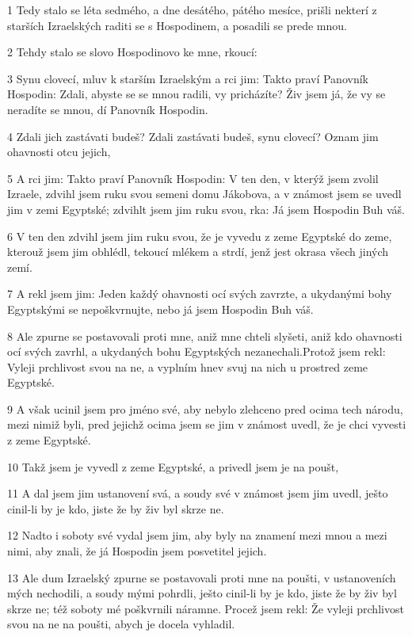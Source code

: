 \par 1 Tedy stalo se léta sedmého, a dne desátého, pátého mesíce, prišli nekterí z starších Izraelských raditi se s Hospodinem, a posadili se prede mnou.
\par 2 Tehdy stalo se slovo Hospodinovo ke mne, rkoucí:
\par 3 Synu clovecí, mluv k starším Izraelským a rci jim: Takto praví Panovník Hospodin: Zdali, abyste se se mnou radili, vy pricházíte? Živ jsem já, že vy se neradíte se mnou, dí Panovník Hospodin.
\par 4 Zdali jich zastávati budeš? Zdali zastávati budeš, synu clovecí? Oznam jim ohavnosti otcu jejich,
\par 5 A rci jim: Takto praví Panovník Hospodin: V ten den, v kterýž jsem zvolil Izraele, zdvihl jsem ruku svou semeni domu Jákobova, a v známost jsem se uvedl jim v zemi Egyptské; zdvihlt jsem jim ruku svou, rka: Já jsem Hospodin Buh váš.
\par 6 V ten den zdvihl jsem jim ruku svou, že je vyvedu z zeme Egyptské do zeme, kterouž jsem jim obhlédl, tekoucí mlékem a strdí, jenž jest okrasa všech jiných zemí.
\par 7 A rekl jsem jim: Jeden každý ohavnosti ocí svých zavrzte, a ukydanými bohy Egyptskými se nepoškvrnujte, nebo já jsem Hospodin Buh váš.
\par 8 Ale zpurne se postavovali proti mne, aniž mne chteli slyšeti, aniž kdo ohavnosti ocí svých zavrhl, a ukydaných bohu Egyptských nezanechali.Protož jsem rekl: Vyleji prchlivost svou na ne, a vyplním hnev svuj na nich u prostred zeme Egyptské.
\par 9 A však ucinil jsem pro jméno své, aby nebylo zlehceno pred ocima tech národu, mezi nimiž byli, pred jejichž ocima jsem se jim v známost uvedl, že je chci vyvesti z zeme Egyptské.
\par 10 Takž jsem je vyvedl z zeme Egyptské, a privedl jsem je na poušt,
\par 11 A dal jsem jim ustanovení svá, a soudy své v známost jsem jim uvedl, ješto cinil-li by je kdo, jiste že by živ byl skrze ne.
\par 12 Nadto i soboty své vydal jsem jim, aby byly na znamení mezi mnou a mezi nimi, aby znali, že já Hospodin jsem posvetitel jejich.
\par 13 Ale dum Izraelský zpurne se postavovali proti mne na poušti, v ustanoveních mých nechodili, a soudy mými pohrdli, ješto cinil-li by je kdo, jiste že by živ byl skrze ne; též soboty mé poškvrnili náramne. Procež jsem rekl: Že vyleji prchlivost svou na ne na poušti, abych je docela vyhladil.
